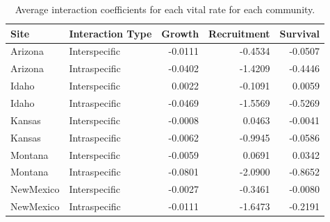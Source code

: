 \documentclass[12pt,]{article}
\begin{document}
\begin{table}[ht]
\centering
\caption{Average interaction coefficients for each vital rate for each community.} 
\begin{tabular}{llrrr}
  \hline
Site & Interaction Type & Growth & Recruitment & Survival \\ 
  \hline
Arizona & Interspecific & -0.0111 & -0.4534 & -0.0507 \\ 
  Arizona & Intraspecific & -0.0402 & -1.4209 & -0.4446 \\ 
  Idaho & Interspecific & 0.0022 & -0.1091 & 0.0059 \\ 
  Idaho & Intraspecific & -0.0469 & -1.5569 & -0.5269 \\ 
  Kansas & Interspecific & -0.0008 & 0.0463 & -0.0041 \\ 
  Kansas & Intraspecific & -0.0062 & -0.9945 & -0.0586 \\ 
  Montana & Interspecific & -0.0059 & 0.0691 & 0.0342 \\ 
  Montana & Intraspecific & -0.0801 & -2.0900 & -0.8652 \\ 
  NewMexico & Interspecific & -0.0027 & -0.3461 & -0.0080 \\ 
  NewMexico & Intraspecific & -0.0111 & -1.6473 & -0.2191 \\ 
   \hline
\end{tabular}
\end{table}
\end{document}
